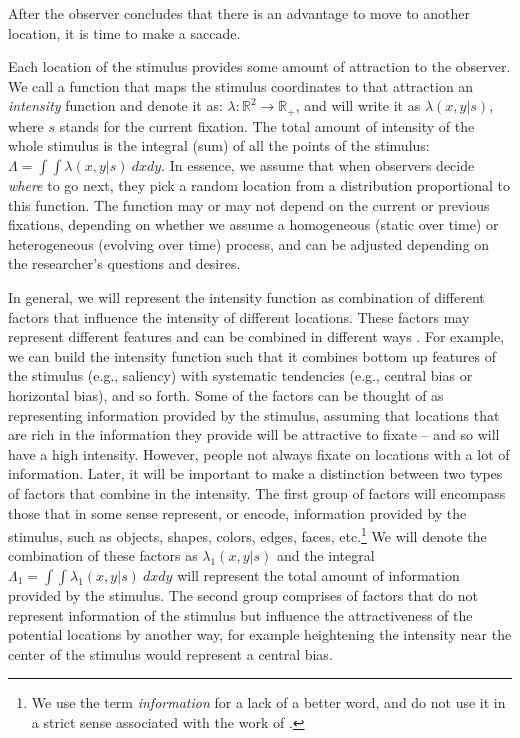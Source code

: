 \documentclass{article}
\begin{document}
After the observer concludes that there is an advantage to move to another location, it is time to make a saccade.

Each location of the stimulus provides some amount of attraction to the observer. We call a function that maps the stimulus coordinates to that attraction an \textit{intensity} function and denote it as: $\lambda: \mathbb{R}^2 \rightarrow \mathbb{R}_+$, and will write it as $\lambda(x, y | s)$, where $s$ stands for the current fixation. The total amount of intensity of the whole stimulus is the integral (sum) of all the points of the stimulus: $\Lambda = \int\int \lambda(x, y | s)~dx dy$. In essence, we assume that when observers decide \textit{where} to go next, they pick a random location from a distribution proportional to this function. The function may or may not depend on the current or previous fixations, depending on whether we assume a homogeneous (static over time) or heterogeneous (evolving over time) process, and can be adjusted depending on the researcher's questions and desires.

In general, we will represent the intensity function as combination of different factors that influence the intensity of different locations. These factors may represent different features and can be combined in different ways \citep[see][]{barthelme2013spatial}. For example, we can build the intensity function such that it combines bottom up features of the stimulus (e.g., saliency) with systematic tendencies (e.g., central bias or horizontal bias), and so forth. Some of the factors can be thought of as representing information provided by the stimulus, assuming that locations that are rich in the information they provide will be attractive to fixate -- and so will have a high intensity. However, people not always fixate on locations with a lot of information. Later, it will be important to make a distinction between two types of factors that combine in the intensity. The first group of factors will encompass those that in some sense represent, or encode, information provided by the stimulus, such as objects, shapes, colors, edges, faces, etc.\footnote{We use the term \textit{information} for a lack of a better word, and do not use it in a strict sense associated with the work of \citet{shannon1948communication}.} We will denote the combination of these factors as $\lambda_1(x, y |s)$ and the integral $\Lambda_1 = \int\int \lambda_1(x, y | s)~dx dy$ will represent the total amount of information provided by the stimulus. The second group comprises of factors that do not represent information of the stimulus but influence the attractiveness of the potential locations by another way, for example heightening the intensity near the center of the stimulus would represent a central bias.
\end{document}
